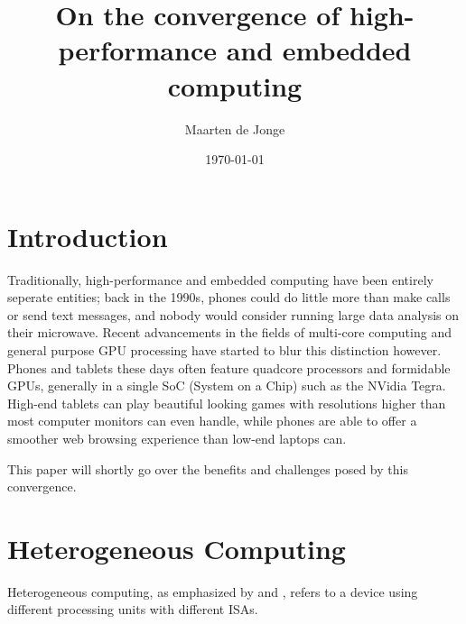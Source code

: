 \documentclass[a4paper]{article}
\author{Maarten de Jonge}
\date{\today}
\title{On the convergence of high-performance and embedded computing}
\begin{document}
\maketitle

\section{Introduction}
Traditionally, high-performance and embedded computing have been entirely
seperate entities; back in the 1990s, phones could do little more than make
calls or send text messages, and nobody would consider running large data
analysis on their microwave. Recent advancements in the fields of multi-core
computing and general purpose GPU processing have started to blur this
distinction however. Phones and tablets these days often feature quadcore
processors and formidable GPUs, generally in a single SoC (System on a Chip)
such as the NVidia Tegra. High-end tablets can play beautiful looking games with
resolutions higher than most computer monitors can even handle, while phones are
able to offer a smoother web browsing experience than low-end laptops can.

This paper will shortly go over the benefits and challenges posed by this
convergence.

\section{Heterogeneous Computing}
Heterogeneous computing, as emphasized by \cite{conf/iccd/KaeliA11} and
\cite{crowley2006impact}, refers to a device using different processing units
with different ISAs.



\end{document}
